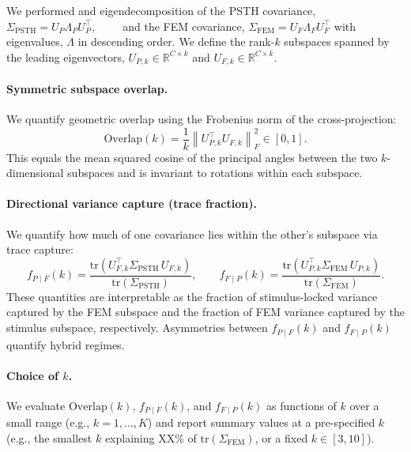 \documentclass{lite}
\begin{document}
We performed and eigendecomposition of the PSTH covariance, $\Sigma_{\mathrm{PSTH}} = U_P \Lambda_P U_P^\top,\qquad$ and the FEM covariance, $\Sigma_{\mathrm{FEM}} = U_F \Lambda_F U_F^\top$
with eigenvalues, $\Lambda$ in descending order. We define the rank-$k$ subspaces spanned by the leading
eigenvectors,
$U_{P,k} \in \mathbb{R}^{C\times k}$
and $U_{F,k}\in\mathbb{R}^{C\times k}$.

\paragraph{Symmetric subspace overlap.}
We quantify geometric overlap using the Frobenius norm of the cross-projection:
\begin{equation}
\mathrm{Overlap}(k)=\frac{1}{k}\left\lVert U_{P,k}^\top U_{F,k}\right\rVert_F^2 \in[0,1].
\end{equation}
This equals the mean squared cosine of the principal angles between the two $k$-dimensional
subspaces and is invariant to rotations within each subspace.

\paragraph{Directional variance capture (trace fraction).}
We quantify how much of one covariance lies within the other's subspace via trace capture:
\begin{equation}
f_{P\mid F}(k)=\frac{\mathrm{tr}\!\left(U_{F,k}^\top \Sigma_{\mathrm{PSTH}}\, U_{F,k}\right)}{\mathrm{tr}(\Sigma_{\mathrm{PSTH}})},\qquad
f_{F\mid P}(k)=\frac{\mathrm{tr}\!\left(U_{P,k}^\top \Sigma_{\mathrm{FEM}}\, U_{P,k}\right)}{\mathrm{tr}(\Sigma_{\mathrm{FEM}})}.
\end{equation}
These quantities are interpretable as the fraction of stimulus-locked variance captured by the FEM
subspace and the fraction of FEM variance captured by the stimulus subspace, respectively.
Asymmetries between $f_{P\mid F}(k)$ and $f_{F\mid P}(k)$ quantify hybrid regimes.

\paragraph{Choice of $k$.}
We evaluate $\mathrm{Overlap}(k)$, $f_{P\mid F}(k)$, and $f_{F\mid P}(k)$ as functions of $k$ over a
small range (e.g., $k=1,\dots,K$) and report summary values at a pre-specified $k$ (e.g., the smallest
$k$ explaining XX\% of $\mathrm{tr}(\Sigma_{\mathrm{FEM}})$, or a fixed $k\in[3,10]$).
\end{document}
